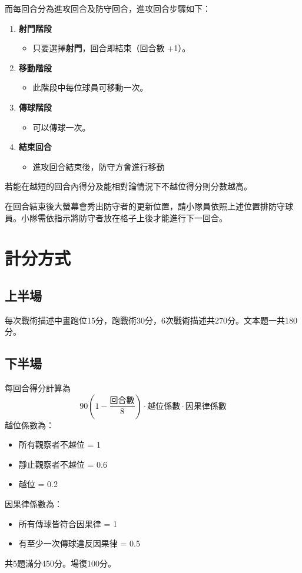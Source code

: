 \documentclass[12pt]{article}
\begin{document}
而每回合分為進攻回合及防守回合，進攻回合步驟如下：
\begin{enumerate}
  \item \textbf{射門階段}
  \begin{itemize}
    \item 只要選擇\textbf{射門}，回合即結束（回合數 +1）。
  \end{itemize}
  \item \textbf{移動階段}
  \begin{itemize}
    \item 此階段中每位球員可移動一次。
  \end{itemize}
  \item \textbf{傳球階段}
  \begin{itemize}
    \item 可以傳球一次。
  \end{itemize}
  \item \textbf{結束回合}
  \begin{itemize}
    \item 進攻回合結束後，防守方會進行移動
  \end{itemize}
\end{enumerate}

若能在越短的回合內得分及能相對論情況下不越位得分則分數越高。

在回合結束後大螢幕會秀出防守者的更新位置，請小隊員依照上述位置排防守球員。小隊需依指示將防守者放在格子上後才能進行下一回合。

\section*{計分方式}
\subsection*{上半場}
每次戰術描述中畫跑位15分，跑戰術30分，6次戰術描述共270分。文本題一共180分。

\subsection*{下半場}
每回合得分計算為
\[
90 \left(1-\frac{\text{回合數}}{8}\right)\cdot\text{越位係數}\cdot\text{因果律係數}
\]
越位係數為：
\begin{itemize}
  \item 所有觀察者不越位 = 1
  \item 靜止觀察者不越位 = 0.6
  \item 越位 = 0.2
\end{itemize}

因果律係數為：
\begin{itemize}
  \item 所有傳球皆符合因果律 = 1
  \item 有至少一次傳球違反因果律 = 0.5
\end{itemize}

共5題滿分450分。場復100分。
\end{document}
